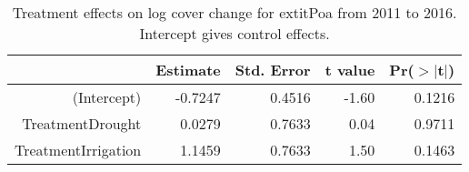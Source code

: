 \begin{table}[ht]
\centering
\caption{Treatment effects on log cover change for 	extit{Poa} from 2011 to 2016. Intercept gives control effects.} 
\label{table:changePOSE}
\begin{tabular}{rrrrr}
  \hline
 & Estimate & Std. Error & t value & Pr($>$$|$t$|$) \\ 
  \hline
(Intercept) & -0.7247 & 0.4516 & -1.60 & 0.1216 \\ 
  TreatmentDrought & 0.0279 & 0.7633 & 0.04 & 0.9711 \\ 
  TreatmentIrrigation & 1.1459 & 0.7633 & 1.50 & 0.1463 \\ 
   \hline
\end{tabular}
\end{table}
